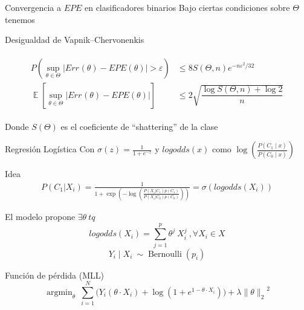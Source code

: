 \documentclass[xcolor=x11names]{beamer}
\DeclareMathOperator{\Expect}{\mathbb{E}}
\DeclareMathOperator{\trainsetn}{\mathcal{T}^{(n)}}
\begin{document}

\begin{frame}{Convergencia a $EPE$ en clasificadores binarios}
Bajo ciertas condiciones sobre $\Theta$ tenemos
	\begin{block}{Desigualdad de Vapnik–Chervonenkis}

		\begin{align*}
			\begin{split}
				P\left(\sup_{\theta\in \Theta}\left|Err_{\trainsetn}(\theta)-EPE (\theta)\right|>\varepsilon \right) & \leq
				8S (\Theta,n) e^{{-n \varepsilon^{2}/32}}\\
				\Expect\left[\sup_{\theta \in \Theta}\left| Err_{\trainsetn}(\theta)-EPE (\theta)\right|\right] &
				\leq 2\sqrt{\dfrac{\log S(\Theta,n)+\log2}{n}}
			\end{split}
		\end{align*}

	\end{block}

	Donde $S(\Theta)$ es el coeficiente de ``shattering'' de la clase
\end{frame}


\begin{frame}[shrink=5]{Regresión Logística}
Con $\sigma(z) = \frac{1}{1 + e^{-z}}$ y $logodds(x)$ como $\log \left(  \frac{ P(C_1 \mid x)}{P(C_0 \mid x ) } \right)$
	\begin{block}{Idea}
	\footnotesize
	\begin{align*}
		P(C_1| X_i)  = \frac{1}{1 + \exp \left(- \log \left(  \frac{ P(X_i|C_1)p(C_1)}{P(X_i|C_0)p(C_0)} \right) \right)} = \sigma\left(logodds(X_i)\right)
	\end{align*}

	El modelo propone $\exists \theta \ tq$
	$$logodds(X_i) = \sum_{j=1}^p \theta^j \ X_i^j  \ , \forall X_i \in X $$
	$$Y_i \mid X_i \ \sim \operatorname{Bernoulli}(p_i)$$

	\end{block}

	\begin{block}{Función de pérdida (MLL)}
		$$\operatorname{argmin}_{\theta} \ \sum_{i=1}^N \big(Y_i ( \theta \cdot X_i ) + \log(1 + e^{1- \theta \cdot X_i} ) \big) + \lambda { \| \theta \|_{2}}^2$$
	\end{block}
\end{frame}
\end{document}

